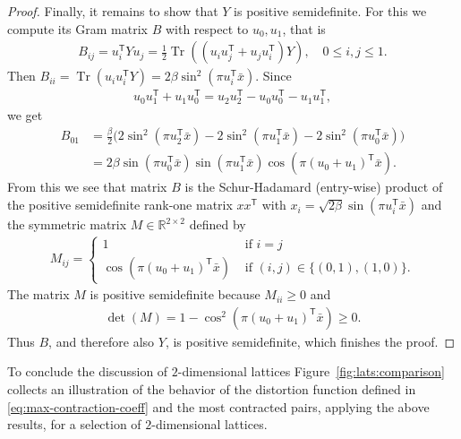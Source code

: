 \documentclass{amsart}
\newcommand{\R}{\mathbb{R}}
\DeclareMathOperator{\Tr}{Tr}
\begin{document}
\begin{proof}
	Finally, it remains to show that $Y$ is positive semidefinite.
        For this we compute its Gram matrix $B$ with respect to $u_0,
        u_1$, that is
	\begin{align*}
		B_{ij} =u_i^\mathsf{T}Y u_j = \frac{1}{2}\Tr((u_i u_j^\mathsf{T} + u_j u_i^\mathsf{T})Y), \quad 0 \le i,j \le 1.
	\end{align*}
	Then $B_{ii} = \Tr(u_iu_i^\mathsf{T}{Y}) =
        2 \beta \sin^2(\pi u_i^\mathsf{T}\bar{x})$.
	Since
	\begin{align*}
		u_0 u_1^\mathsf{T} + u_1 u_0^\mathsf{T} = u_{2}u_{2}^\mathsf{T} - u_0u_0^\mathsf{T} - u_1u_1^\mathsf{T},
	\end{align*}
	we get
	\begin{align*}
		B_{01} &= \frac{\beta}{2}\Big (2\sin^2(\pi u_{2}^\mathsf{T}\bar{x}) - 2\sin^2(\pi u_{1}^\mathsf{T}\bar{x}) - 2\sin^2(\pi u_{0}^\mathsf{T}\bar{x}) \Big )   \\
		&=2\beta \sin(\pi u_{0}^\mathsf{T}\bar{x})\sin(\pi u_{1}^\mathsf{T}\bar{x})\cos(\pi (u_0+u_1)^\mathsf{T}\bar{x}).
	\end{align*}
        From this we see that matrix $B$ is the Schur-Hadamard
        (entry-wise) product of the positive semidefinite rank-one
        matrix $xx^\mathsf{T}$ with
        $x_i = \sqrt{2\beta} \sin(\pi u_i^\mathsf{T}\bar{x})$ and the
        symmetric matrix $M \in \R^{2 \times 2}$ defined by
	\begin{align*}
		M_{ij} = \begin{cases}
			1 &\text{ if } i = j  \\
			\cos(\pi (u_0+u_1)^\mathsf{T}\bar{x}) &\text{ if } (i,j) \in \{(0,1),(1,0)\}.
		\end{cases}
	\end{align*}
	The matrix $M$ is positive semidefinite because $M_{ii} \ge 0$ and
	\begin{align*}
		\det(M) = 1 - \cos^2(\pi (u_0+u_1)^\mathsf{T}\bar{x}) \ge 0.
	\end{align*}
        Thus $B$, and therefore also $Y$, is positive semidefinite,
        which finishes the proof.
\end{proof}

To conclude the discussion of $2$-dimensional lattices
Figure~\ref{fig:lats:comparison} collects an illustration of the
behavior of the distortion function defined in
\eqref{eq:max-contraction-coeff} and the most contracted pairs,
applying the above results, for a selection of $2$-dimensional
lattices.
\end{document}
